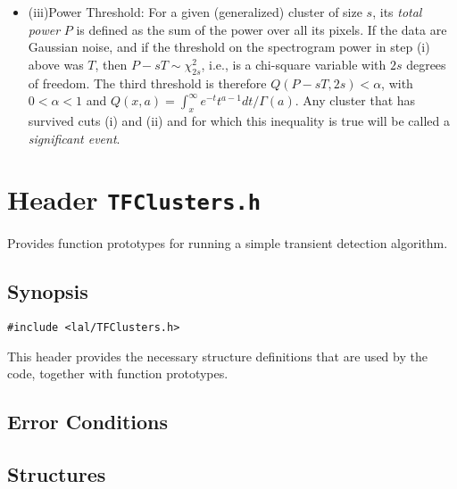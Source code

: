 \begin{itemize}
\item{(iii)Power Threshold:} For a given (generalized) cluster of size $s$, its {\it total power} $P$ is defined as the sum of the power over all its pixels. If the data are Gaussian noise, and if the threshold on the spectrogram power in step (i) above was $T$, then $P-sT \sim \chi^2_{2s}$, i.e., is a chi-square variable with $2s$ degrees of freedom. The third threshold is therefore $Q(P-sT,2s) < \alpha$, with $0<\alpha<1$ and $Q(x,a) = \int_x^\infty e^{-t}t^{a-1} dt / \Gamma(a)$. Any cluster that has survived cuts (i) and (ii) and for which this inequality is true will be called a {\it significant event}.
\end{itemize}

\newpage
\section{Header \texttt{TFClusters.h}}
\label{s:TFClusters.h}

\noindent Provides function prototypes for running a simple transient detection algorithm.

\subsection*{Synopsis}
\begin{verbatim}
#include <lal/TFClusters.h>
\end{verbatim}

\noindent This header provides the necessary structure definitions that are used by the code, together with function prototypes.




\subsection*{Error Conditions}

	
\newpage
\subsection*{Structures}


\newpage
